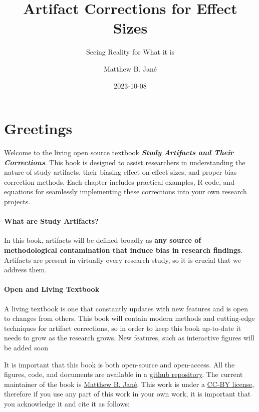 \documentclass[
  letterpaper,
  DIV=11,
  numbers=noendperiod]{scrreprt}
\title{Artifact Corrections for Effect Sizes}
\subtitle{Seeing Reality for What it is}
\author{Matthew B. Jané}
\date{2023-10-08}
\renewcommand*\contentsname{Table of contents}
\newcommand\contentsname{Table of contents}
\begin{document}
\maketitle

\renewcommand*\contentsname{Table of contents}
{
\hypersetup{linkcolor=}
\setcounter{tocdepth}{2}
\tableofcontents
}

\chapter{Greetings}\label{greetings}

Welcome to the living open source textbook \textbf{\emph{Study Artifacts
and Their Corrections}}. This book is designed to assist researchers in
understanding the nature of study artifacts, their biasing effect on
effect sizes, and proper bias correction methods. Each chapter includes
practical examples, R code, and equations for seamlessly implementing
these corrections into your own research projects.

\subsubsection*{What are Study
Artifacts?}\label{what-are-study-artifacts}

In this book, artifacts will be defined broadly as \textbf{any source of
methodological contamination that induce bias in research findings}.
Artifacts are present in virtually every research study, so it is
crucial that we address them.

\subsubsection*{Open and Living
Textbook}\label{open-and-living-textbook}

A living textbook is one that constantly updates with new features and
is open to changes from others. This book will contain modern methods
and cutting-edge techniques for artifact corrections, so in order to
keep this book up-to-date it needs to grow as the research grows. New
features, such as interactive figures will be added soon

It is important that this book is both open-source and open-access. All
the figures, code, and documents are available in a
\href{https://github.com/MatthewBJane/artifact-corrections-for-effect-sizes/}{github
repository}. The current maintainer of the book is
\href{https://matthewbjane.com}{Matthew B. Jané}. This work is under a
\href{LICENSE}{CC-BY license}, therefore if you use any part of this
work in your own work, it is important that you acknowledge it and cite
it as follows:
\end{document}
